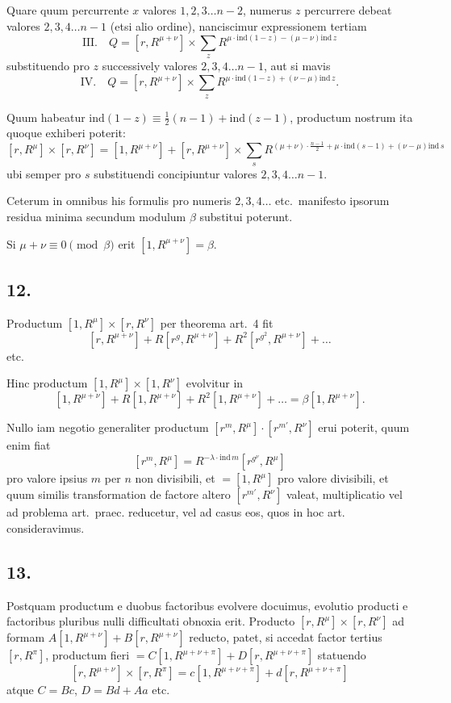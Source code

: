 \documentclass[12pt,a4paper]{article}
\begin{document}
Quare quum percurrente $x$ valores $1, 2, 3\ldots n-2$, numerus $z$ percurrere debeat valores $2, 3, 4\ldots n-1$ (etsi alio ordine), nanciscimur expressionem tertiam
\[
\text{III.}\quad Q = [r, R^{\mu+\nu}] \times \sum_{z} R^{\mu\cdot\text{ind}(1-z) - (\mu-\nu)\text{ind}\,z}
\]
substituendo pro $z$ successively valores $2, 3, 4\ldots n-1$, aut si mavis
\[
\text{IV.}\quad Q = [r, R^{\mu+\nu}] \times \sum_{z} R^{\mu\cdot\text{ind}(1-z) + (\nu-\mu)\text{ind}\,z}.
\]

Quum habeatur $\text{ind}(1-z) \equiv \frac{1}{2}(n-1) + \text{ind}(z-1)$, productum nostrum ita quoque exhiberi poterit:
\[
[r,R^\mu] \times [r,R^\nu] = [1, R^{\mu+\nu}] + [r, R^{\mu+\nu}] \times \sum_{s} R^{(\mu+\nu)\cdot\frac{n-1}{2} + \mu\cdot\text{ind}(s-1) + (\nu-\mu)\text{ind}\,s}
\]
ubi semper pro $s$ substituendi concipiuntur valores $2, 3, 4\ldots n-1$.

Ceterum in omnibus his formulis pro numeris $2, 3, 4\ldots$ etc.\ manifesto ipsorum residua minima secundum modulum $\beta$ substitui poterunt.

Si $\mu + \nu \equiv 0 \pmod{\beta}$ erit $[1, R^{\mu+\nu}] = \beta$.

\subsection*{12.}

Productum $[1, R^\mu] \times [r, R^\nu]$ per theorema art.\ 4 fit
\[
[r, R^{\mu+\nu}] + R[r^{g}, R^{\mu+\nu}] + R^2[r^{g^2}, R^{\mu+\nu}] + \ldots
\]
etc.

Hinc productum $[1, R^\mu] \times [1, R^\nu]$ evolvitur in
\[
[1, R^{\mu+\nu}] + R[1, R^{\mu+\nu}] + R^2[1, R^{\mu+\nu}] + \ldots = \beta[1, R^{\mu+\nu}].
\]

Nullo iam negotio generaliter productum $[r^m, R^\mu] \cdot [r^{m'}, R^\nu]$ erui poterit, quum enim fiat
\[
[r^m, R^\mu] = R^{-\lambda\cdot\text{ind}\,m}[r^{g^\nu}, R^\mu]
\]
pro valore ipsius $m$ per $n$ non divisibili, et $=[1, R^\mu]$ pro valore divisibili, et quum similis transformation de factore altero $[r^{m'}, R^\nu]$ valeat, multiplicatio vel ad problema art.\ praec. reducetur, vel ad casus eos, quos in hoc art. consideravimus.

\subsection*{13.}

Postquam productum e duobus factoribus evolvere docuimus, evolutio producti e factoribus pluribus nulli difficultati obnoxia erit. Producto $[r, R^\mu] \times [r, R^\nu]$ ad formam $A[1, R^{\mu+\nu}] + B[r, R^{\mu+\nu}]$ reducto, patet, si accedat factor tertius $[r, R^\pi]$, productum fieri $= C[1, R^{\mu+\nu+\pi}] + D[r, R^{\mu+\nu+\pi}]$ statuendo
\[
[r, R^{\mu+\nu}] \times [r, R^\pi] = c[1, R^{\mu+\nu+\pi}] + d[r, R^{\mu+\nu+\pi}]
\]
atque $C = Bc$, $D = Bd + Aa$ etc.
\end{document}
